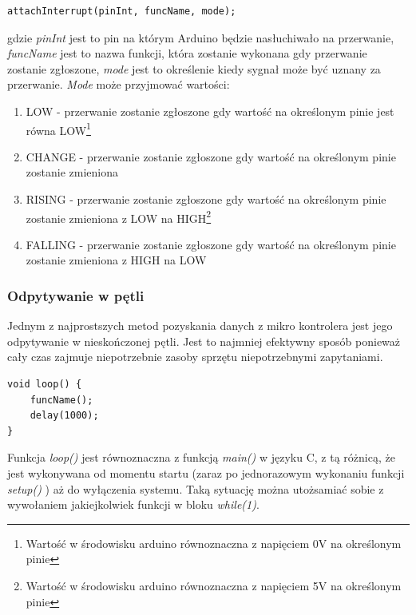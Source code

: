 \documentclass{xmgr}
\begin{document}
\begin{lstlisting}[label=bot-dirs-alg,caption=Obsługa przerwań sprzętowych w środowisku Arduino]
attachInterrupt(pinInt, funcName, mode);
\end{lstlisting}
gdzie \emph{pinInt} jest to pin na którym Arduino będzie nasłuchiwało na przerwanie, \emph{funcName} jest to nazwa funkcji, która zostanie wykonana gdy przerwanie zostanie zgłoszone, \emph{mode} jest to określenie kiedy sygnał może być uznany za przerwanie. \emph{Mode} może przyjmować wartości: 
\begin{enumerate}
	\item LOW - przerwanie zostanie zgłoszone gdy wartość na określonym pinie jest równa LOW\footnote{Wartość w środowisku arduino równoznaczna z napięciem 0V na określonym pinie}
	\item CHANGE - przerwanie zostanie zgłoszone gdy wartość na określonym pinie zostanie zmieniona
	\item RISING - przerwanie zostanie zgłoszone gdy wartość na określonym pinie zostanie zmieniona z LOW na HIGH\footnote{Wartość w środowisku arduino równoznaczna z napięciem 5V na określonym pinie}
	\item FALLING - przerwanie zostanie zgłoszone gdy wartość na określonym pinie zostanie zmieniona z HIGH na LOW
\end{enumerate}

\subsubsection{Odpytywanie w pętli}
Jednym z najprostszych metod pozyskania danych z mikro kontrolera jest jego odpytywanie w nieskończonej pętli. Jest to najmniej efektywny sposób ponieważ cały czas zajmuje niepotrzebnie zasoby sprzętu niepotrzebnymi zapytaniami.

\begin{lstlisting}[label=bot-dirs-alg,caption=Odpytywanie w nieskończonej pętli w środowisku Arduino]
void loop() {
	funcName();
	delay(1000);
}
\end{lstlisting}

Funkcja \emph{loop()} jest równoznaczna z funkcją \emph{main()} w języku C, z tą różnicą, że jest wykonywana od momentu startu (zaraz po jednorazowym wykonaniu funkcji \emph{setup()} ) aż do wyłączenia systemu. Taką sytuację można utożsamiać sobie z wywołaniem jakiejkolwiek funkcji w bloku \emph{while(1)}.
\end{document}
